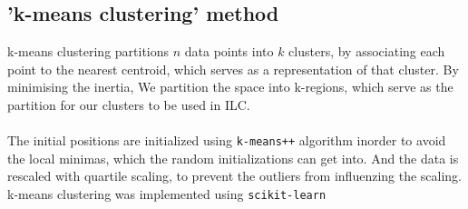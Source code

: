 \subsection{'k-means clustering' method}
k-means clustering partitions $n$ data points into $k$ clusters, by associating each point to the
nearest centroid, which serves as a representation of that cluster. By minimising the inertia,
We partition the space into k-regions, which serve as the partition for our clusters to be used in
ILC.
\\
\\
The initial positions are initialized using \texttt{k-means++} algorithm inorder to avoid the
local minimas, which the random initializations can get into. And the data is rescaled with
quartile scaling, to prevent the outliers from influenzing the scaling.
k-means clustering was implemented
using \texttt{scikit-learn} \cite{scikit-learn}

